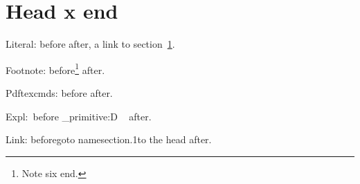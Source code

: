 \documentclass{article}
\begin{document}
\tableofcontents

\section{Head \pdfprimitive{}x end}\label{head}

Literal: before\pdfprimitive{} after, a link to section~\ref{head}.

Footnote: before\footnote{Note\pdfprimitive{} six end.} after.

\makeatletter
Pdftexcmds: before\pdf@primitive{} after.
\makeatother

\ExplSyntaxOn
Expl:~before \tex_primitive:D  ~ after.
\ExplSyntaxOff

Link: before\pdfprimitive\pdfstartlink goto name{section.1}to the head\pdfprimitive\pdfendlink{} after.
\end{document}
